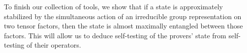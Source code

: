 To finish our collection of tools, we show that if a state is approximately stabilized by the simultaneous action of an irreducible group representation on two tensor factors, then the state is almost maximally entangled between those factors. This will allow us to deduce self-testing of the provers' state from self-testing of their operators.






